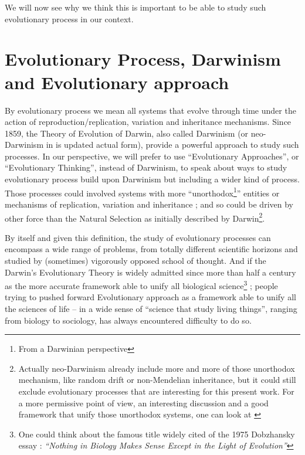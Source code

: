 \documentclass[a4paper]{article}
\begin{document}
We will now see why we think this is important to be able to study such evolutionary process in our context.


\section{Evolutionary Process, Darwinism and Evolutionary approach}

By evolutionary process we mean all systems that evolve through time under the action of reproduction/replication, variation and inheritance mechanisms. Since 1859, the Theory of Evolution of Darwin, also called Darwinism (or neo-Darwinism in is updated actual form), provide a powerful approach to study such processes\nocite{darwin1859originspeciesbymeansnaturalselectionorpreservationfavouredracesstrugglelife}.
In our perspective, we will prefer to use ``Evolutionary Approaches'', or ``Evolutionary Thinking'', instead of Darwinism, to speak about ways to study evolutionary process build upon Darwinism but including a wider kind of process. Those processes could involved systems with more ``unorthodox\footnote{From a Darwinian perspective}'' entities or mechanisms of replication, variation and inheritance ; and so could be driven by other force than the Natural Selection as initially described by Darwin\footnote{Actually neo-Darwinism already include more and more of those unorthodox mechanism, like random drift or non-Mendelian inheritance, but it could still exclude evolutionary processes that are interesting for this present work. For a more permissive point of view, an interesting discussion and a good framework that unify those unorthodox systems, one can look at \cite{godfrey2009darwinian}}.

By itself and given this definition, the study of evolutionary processes can encompass a wide range of problems, from totally different scientific horizons and studied by (sometimes) vigorously opposed school of thought. And if the Darwin's Evolutionary Theory is widely admitted since more than half a century as the more accurate framework able to unify all biological science\footnote{One could think about the famous title widely cited of the 1975 Dobzhansky essay : \emph{``Nothing in Biology Makes Sense Except in the Light of Evolution''}} ; people trying to pushed forward Evolutionary approach as a framework able to unify all the sciences of life -- in a wide sense of ``science that study living things'', ranging from biology to sociology, has always encountered difficulty to do so.
\end{document}
